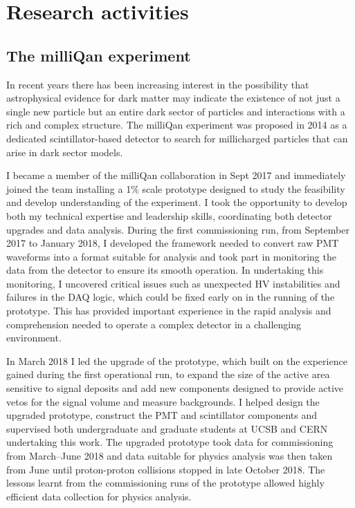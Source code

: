 \documentclass[11pt]{article}
\theoremstyle{plain} \numberwithin{equation}{section}
\theoremstyle{definition}
\begin{document}
\section*{Research activities}

\subsection*{The milliQan experiment}

In recent years there has been increasing interest in the possibility 
that astrophysical evidence for dark matter may indicate the existence 
of not just a single new particle but an entire dark sector
of particles and interactions with a rich and complex structure. The milliQan experiment 
was proposed in 2014 as a dedicated scintillator-based detector to search 
for millicharged particles that can arise in dark sector models. 

I became a member of the milliQan collaboration in Sept 2017 and immediately joined the
team installing a 1\% scale prototype designed to study the feasibility and
develop understanding of the experiment. I took the opportunity to develop
both my technical expertise and leadership skills, coordinating both
detector upgrades and data analysis. During the first commissioning run, 
from September 2017 to January 2018, I developed the framework 
needed to convert raw PMT waveforms into 
a format suitable for analysis and took part in monitoring
the data from the detector to ensure its smooth operation. 
In undertaking this monitoring, I uncovered critical issues such as unexpected
HV instabilities and failures in the DAQ logic, which 
could be fixed early on in the running of the prototype.
This has provided important
experience in the rapid analysis and comprehension needed to operate
a complex detector in a challenging environment. 

In March 2018 I led the upgrade of the prototype, which built on the experience 
gained during the first operational run, to expand the size of the active area
sensitive to signal deposits and add new components designed to provide
active vetos for the signal volume and measure backgrounds. I helped design the upgraded prototype,
construct the PMT and scintillator components and 
supervised both undergraduate and graduate students at UCSB and CERN undertaking this work.
The upgraded prototype took data for commissioning from March--June 2018 
and data suitable for physics analysis was then taken from June until 
proton-proton collisions stopped in late October 2018. 
The lessons learnt from the commissioning runs of the prototype allowed highly 
efficient data collection for physics analysis.
\end{document}
